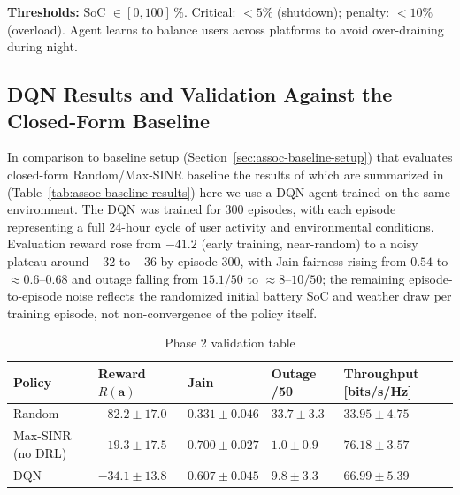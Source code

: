 \documentclass[conference]{IEEEtran}
\begin{document}
\textbf{Thresholds:} SoC $\in [0,100]\,\%$. Critical: $< 5\%$ (shutdown); penalty: $< 10\%$ (overload). Agent learns to balance users across platforms to avoid over-draining during night.

\FloatBarrier

\subsection{DQN Results and Validation Against the Closed-Form Baseline}
\label{sec:phase2-results}


In comparison to baseline setup (Section~\ref{sec:assoc-baseline-setup}) that evaluates
closed-form Random/Max-SINR baseline the results of which are summarized in
(Table~\ref{tab:assoc-baseline-results}) here we use a  DQN agent trained on 
the same environment. The DQN was trained for 300 episodes, with each episode representing a 
full 24-hour cycle of user activity and environmental conditions.
Evaluation reward rose from $-41.2$ (early training, near-random) to a noisy plateau around 
$-32$ to $-36$ by episode 300, with Jain fairness rising from $0.54$ to $\approx0.6$--$0.68$ 
and outage falling from $15.1/50$ to $\approx 8$--$10/50$; the remaining episode-to-episode
noise reflects the randomized initial battery SoC and weather draw per training
episode, not non-convergence of the policy itself.

\begin{table}[t]
\centering
\caption{Phase 2 validation table}
\label{tab:phase2-results}
{\scriptsize\setlength{\tabcolsep}{3pt}
\begin{tabularx}{\columnwidth}{|>{\raggedright\arraybackslash}X|>{\centering\arraybackslash}X|>{\centering\arraybackslash}X|>{\centering\arraybackslash}X|>{\centering\arraybackslash}X|}
\hline
\textbf{Policy} & \textbf{Reward $R(\mathbf{a})$} & \textbf{Jain} & \textbf{Outage /50} & \textbf{Throughput [bits/s/Hz]}\\
\hline
Random & $-82.2\pm17.0$ & $0.331\pm0.046$ & $33.7\pm3.3$ & $33.95\pm4.75$ \\
\hline
Max-SINR (no DRL) & $\mathbf{-19.3\pm17.5}$ & $\mathbf{0.700\pm0.027}$ & $\mathbf{1.0\pm0.9}$ & $\mathbf{76.18\pm3.57}$ \\
\hline
DQN & $-34.1\pm13.8$ & $0.607\pm0.045$ & $9.8\pm3.3$ & $66.99\pm5.39$ \\
\hline
\end{tabularx}}
\end{table}
\end{document}
